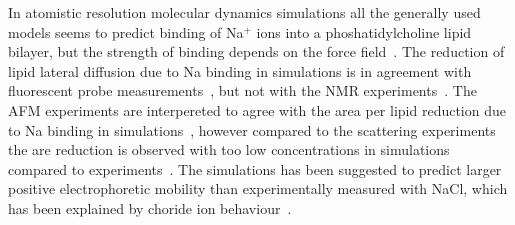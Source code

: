 \documentclass[pre,aps,floatfix,authordate1-4,twocolumn]{revtex4-1}
\begin{document}

In atomistic resolution molecular dynamics simulations all the generally used models seems
to predict binding of Na${^+}$ ions into a phoshatidylcholine lipid bilayer, 
but the strength of binding depends on the force field~\cite{bockmann03,bockmann04,sachs04,berkowitz06,cordomi09,valley11,berkowitz12}. 
The reduction of lipid lateral diffusion due to Na binding in simulations is in agreement with 
fluorescent probe measurements~\cite{bockmann03,vacha09a,harb13}, but not with the NMR experiments~\cite{filippov09}.
The AFM experiments are interpereted to agree with the area per lipid reduction due to Na binding
in simulations~\cite{manyes05,manyes06,fukuma07,ferber11,morata12}, however compared to the scattering experiments the are reduction 
is observed with too low concentrations in simulations compared to experiments~\cite{pabst07}.
The simulations has been suggested to predict larger positive electrophoretic mobility than experimentally
measured with NaCl, which has been explained by choride ion behaviour~\cite{berkowitz06,knecht13}.


\end{document}
